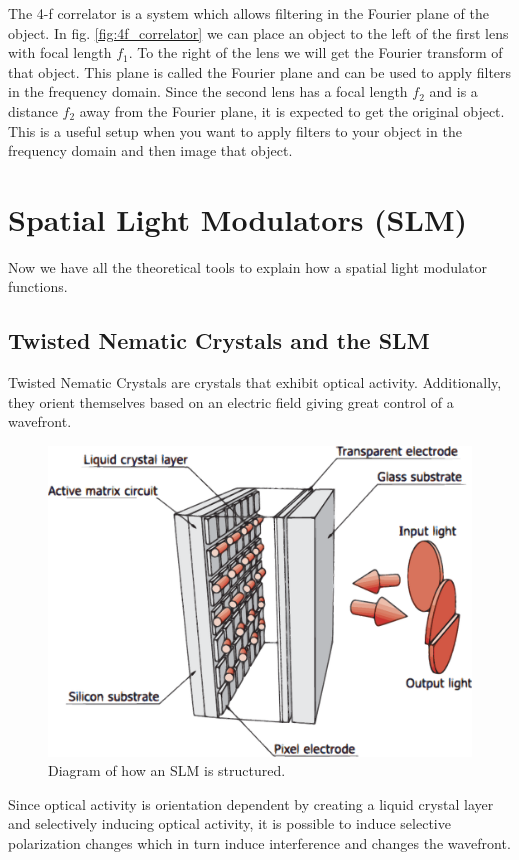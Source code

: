 \documentclass{article}
\begin{document}
The 4-f correlator is a system which allows filtering in the Fourier plane of the object. In fig. \ref{fig:4f_correlator} we can place an object to the left of the first lens with focal length $f_1$. To the right of the lens we will get the Fourier transform of that object. This plane is called the Fourier plane and can be used to apply filters in the frequency domain. Since the second lens has a focal length $f_2$ and is a distance $f_2$ away from the Fourier plane, it is expected to get the original object.
\\
This is a useful setup when you want to apply filters to your object in the frequency domain and then image that object.


\section{Spatial Light Modulators (SLM)}
Now we have all the theoretical tools to explain how a spatial light modulator functions.

\subsection{Twisted Nematic Crystals and the SLM}
Twisted Nematic Crystals are crystals that exhibit optical activity. Additionally, they orient themselves based on an electric field giving great control of a wavefront.

\begin{figure}[!phbt]
    \centering
    \includegraphics[width=0.6\linewidth]{img/twistedcrystals.eps}
    \caption{Diagram of how an SLM is structured.}
    \label{fig:twistedcrystals}
\end{figure}

Since optical activity is orientation dependent by creating a liquid crystal layer and selectively inducing optical activity, it is possible to induce selective polarization changes which in turn induce interference and changes the wavefront.
\end{document}
